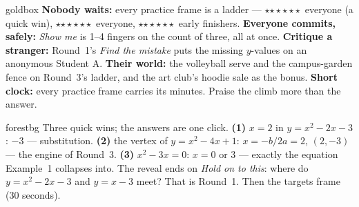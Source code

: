\documentclass[10pt]{article}
\newcommand{\rung}[1]{{\color{goldacc}\ifcase#1\or$\star$\or$\star\star$\or$\star\star\star$\fi}}
\begin{document}
\begin{skillbox}{goldbox}
\textbf{Nobody waits:} every practice frame is a ladder --- \rung1\ everyone (a quick win),
\rung2\ everyone, \rung3\ early finishers. \textbf{Everyone commits, safely:} \emph{Show me} is
1--4 fingers on the count of three, all at once. \textbf{Critique a stranger:} Round~1's
\emph{Find the mistake} puts the missing $y$-values on an anonymous Student A. \textbf{Their
world:} the volleyball serve and the campus-garden fence on Round~3's ladder, and the art club's
hoodie sale as the bonus. \textbf{Short clock:} every practice frame carries its minutes. Praise
the climb more than the answer.
\end{skillbox}

\begin{skillbox}{forestbg}
Three quick wins; the answers are one click. \textbf{(1)} $x=2$ in $y=x^2-2x-3$: $-3$ ---
substitution. \textbf{(2)} the vertex of $y=x^2-4x+1$: $x=-b/2a=2$, $(2,-3)$ --- the engine of
Round~3. \textbf{(3)} $x^2-3x=0$: $x=0$ or $3$ --- exactly the equation Example~1 collapses into.
The reveal ends on \emph{Hold on to this}: where do $y=x^2-2x-3$ and $y=x-3$ meet? That is
Round~1. Then the targets frame (30 seconds).
\end{skillbox}
\end{document}
